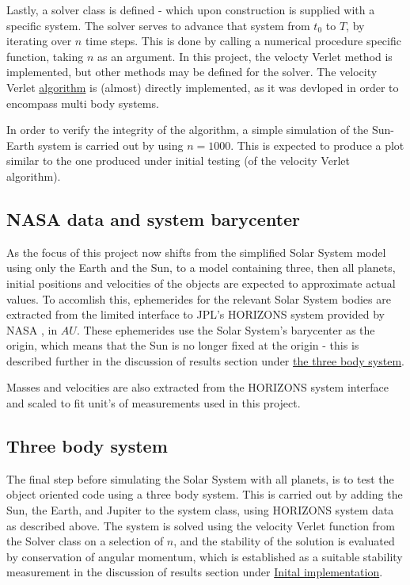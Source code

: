 \documentclass[%
oneside,                 %
final,                   %
10pt]{article}
\begin{document}
Lastly, a solver class is defined - which upon construction is supplied with a specific system. The solver serves to advance that system from $t_{0}$ to $T$, by iterating over $n$ time steps. This is done by calling a numerical procedure specific function, taking $n$ as an argument. In this project, the velocty Verlet method is implemented, but other methods may be defined for the solver. The velocity Verlet \hyperref[subsec:algos]{algorithm} is (almost) directly implemented, as it was devloped in order to encompass multi body systems. \newline

In order to verify the integrity of the algorithm, a simple simulation of the Sun-Earth system is carried out by using $n=1000$. This is expected to produce a plot similar to the one produced under initial testing (of the velocity Verlet algorithm).


\subsection{NASA data and system barycenter}
As the focus of this project now shifts from the simplified Solar System model using only the Earth and the Sun, to a model containing three, then all planets, initial positions and velocities of the objects are expected to approximate actual values. To accomlish this, ephemerides for the relevant Solar System bodies are extracted from the limited interface to JPL's HORIZONS system provided by NASA \cite{nasadata}, in $AU$. These ephemerides use the Solar System's barycenter as the origin, which means that the Sun is no longer fixed at the origin - this is described further in the discussion of results section under  \hyperref[subsec:Discofres:3B]{the three body system}.  \newline

Masses and velocities are also extracted from the HORIZONS system interface and scaled to fit unit's of measurements used in this project.

\subsection{Three body system}
\label{sec:Modmultibody}
The final step before simulating the Solar System with all planets, is to test the object oriented code using a three body system. This is carried out by adding the Sun, the Earth, and Jupiter to the system class, using HORIZONS system data as described above. The system is solved using the velocity Verlet function from the Solver class on a selection of $n$, and the stability of the solution is evaluated by conservation of angular momentum, which is established as a suitable stability measurement in the discussion of results section under \hyperref[subsec:Discofres:initimpl]{Inital implementation}. \newline
\end{document}
